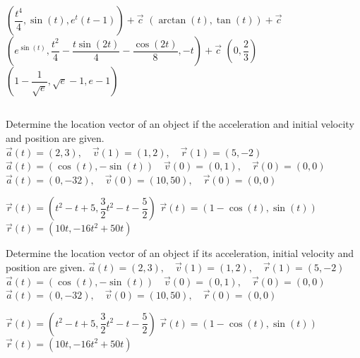 \begin{Answer}
        
             \Question $\left(\dfrac{t^4}{4}, \sin(t), e^t(t-1)  \right) + \vec c$ 
             \Question $\left(\arctan(t), \tan(t)\right)+ \vec c $ 
             \Question $\left(e^{\sin(t)}, \dfrac{t^2}{4} - \dfrac{t \sin(2t)}{4} - \dfrac{\cos(2t)}{8}, -t \right) + \vec c$ 
             \Question $\left( 0, \dfrac{2}{3} \right)$
             \Question $\left(1-\dfrac{1}{\sqrt{e}}, \sqrt{e} - 1, e - 1\right)$ 
         
\end{Answer}


\subsection*{}
\ifcalculus
 \begin{Exercise}[difficulty = 2] Determine the location vector of an object if the acceleration and initial velocity and position are given. 
 		\Question $\vec a(t) = (2,3), \quad \vec v(1) = (1,2), \quad \vec r(1) = (5, -2)$
 		\Question $\vec a(t) = \left(\cos(t), -\sin(t)\right) \quad \vec v(0) = (0,1), \quad \vec r(0) = (0,0)$
 	    \Question $\vec a(t) = (0,-32), \quad \vec v(0) = (10,50), \quad \vec r(0) = (0, 0)$	 
\end{Exercise}

\begin{Answer}
    
 		\Question $\vec r(t) = \left(t^2-t + 5,\dfrac{3}{2}t^2-t - \dfrac{5}{2} \right) $
 		 \Question $\vec r(t) = \left(1-\cos(t), \sin(t) \right)$
 		\Question $\vec r(t) = \left(10t,-16t^2+50t\right)$ 
 	 
\end{Answer}
\fi
 	 	
\ifanalysis
\begin{Exercise} Determine the location vector of an object if its acceleration,  initial velocity and position are given. 
 		\Question[difficulty=1] $\vec a(t) = (2,3), \quad \vec v(1) = (1,2), \quad \vec r(1) = (5, -2)$
 		\Question[difficulty=2] $\vec a(t) = \left(\cos(t), -\sin(t)\right) \quad \vec v(0) = (0,1), \quad \vec r(0) = (0,0)$
 	    \Question[difficulty=2] $\vec a(t) = (0,-32), \quad \vec v(0) = (10,50), \quad \vec r(0) = (0, 0)$	 
\end{Exercise}

\begin{Answer}
    
 		\Question $\vec r(t) = \left(t^2-t + 5,\dfrac{3}{2}t^2-t - \dfrac{5}{2} \right) $
 		 \Question $\vec r(t) = \left(1-\cos(t), \sin(t) \right)$
 		\Question $\vec r(t) = \left(10t,-16t^2+50t\right)$ 
 	 
\end{Answer}
\fi
 		 

